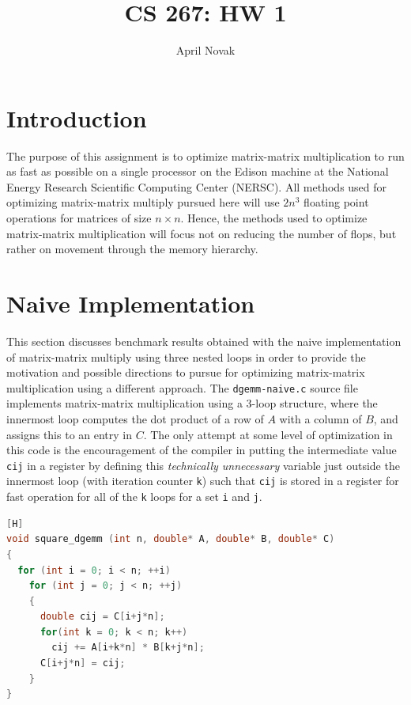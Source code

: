 \documentclass[10pt]{article}
\begin{document}
\title{CS 267: HW 1}
\author{April Novak}

\maketitle

\section{Introduction}

The purpose of this assignment is to optimize matrix-matrix multiplication to run as fast as possible on a single processor on the Edison machine at the National Energy Research Scientific Computing Center (NERSC). All methods used for optimizing matrix-matrix multiply pursued here will use \(2n^3\) floating point operations for matrices of size \(n\times n\). Hence, the methods used to optimize matrix-matrix multiplication will focus not on reducing the number of flops, but rather on movement through the memory hierarchy.

\section{Naive Implementation}

This section discusses benchmark results obtained with the naive implementation of matrix-matrix multiply using three nested loops in order to provide the motivation and possible directions to pursue for optimizing matrix-matrix multiplication using a different approach. The {\tt dgemm-naive.c} source file implements matrix-matrix multiplication using a 3-loop structure, where the innermost loop computes the dot product of a row of \(A\) with a column of \(B\), and assigns this to an entry in \(C\). The only attempt at some level of optimization in this code is the encouragement of the compiler in putting the intermediate value {\tt cij} in a register by defining this \textit{technically unnecessary} variable just outside the innermost loop (with iteration counter {\tt k}) such that {\tt cij} is stored in a register for fast operation for all of the {\tt k} loops for a set {\tt i} and {\tt j}.  

\begin{lstlisting}[language=C][H]
void square_dgemm (int n, double* A, double* B, double* C)
{
  for (int i = 0; i < n; ++i)
    for (int j = 0; j < n; ++j)
    {
      double cij = C[i+j*n];
      for(int k = 0; k < n; k++)
        cij += A[i+k*n] * B[k+j*n];
      C[i+j*n] = cij;
    }
}
\end{lstlisting}
\end{document}
